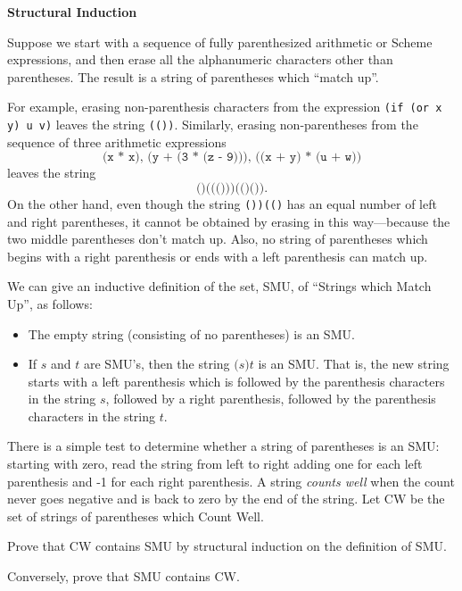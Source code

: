 \documentclass[handout]{mcs}
\begin{document}
\begin{problem} \textbf{Structural Induction}

Suppose we start with a sequence of fully parenthesized arithmetic or
Scheme expressions, and then erase all the alphanumeric characters other
than parentheses.  The result is a string of parentheses which ``match
up''.

For example, erasing non-parenthesis characters from the expression
\texttt{(if (or x y) u v)} leaves the string \texttt{(())}.  Similarly,
erasing non-parentheses from the sequence of three arithmetic expressions
\[
\texttt{(x * x), (y + (3 * (z - 9))), ((x + y) * (u + w))}
\]
leaves the string
\[
\texttt{()((()))(()())}.
\]
On the other hand, even though the string \texttt{())(()} has an equal
number of left and right parentheses, it cannot be obtained by erasing in
this way---because the two middle parentheses don't match up.  Also, no
string of parentheses which begins with a right parenthesis or ends with a
left parenthesis can match up.

We can give an inductive definition of the set, SMU, of ``Strings which
Match Up'', as follows:

\begin{itemize}
\item The empty string (consisting of no parentheses) is an SMU.

\item If $s$ and $t$ are SMU's, then the string $\texttt{(}s\texttt{)}t$
is an SMU.  That is, the new string starts with a left parenthesis which
is followed by the parenthesis characters in the string $s$, followed by a
right parenthesis, followed by the parenthesis characters in the string
$t$.

\end{itemize}


There is a simple test to determine whether a string of parentheses is an
SMU: starting with zero, read the string from left to right adding one for
each left parenthesis and -1 for each right parenthesis.  A string
\emph{counts well} when the count never goes negative and is back to zero
by the end of the string.  Let CW be the set of strings of parentheses
which Count Well.

\begin{problemparts}
\problempart Prove that CW contains SMU by structural induction on the
definition of SMU.

\problempart Conversely, prove that SMU contains CW.

\end{problemparts}
\end{problem}
\end{document}
